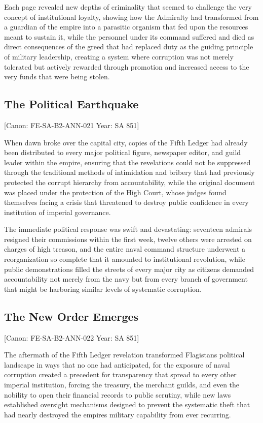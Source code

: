 Each page revealed new depths of criminality that seemed to challenge
the very concept of institutional loyalty, showing how the Admiralty had
transformed from a guardian of the empire into a parasitic organism that
fed upon the resources meant to sustain it, while the personnel under
its command suffered and died as direct consequences of the greed that
had replaced duty as the guiding principle of military leadership,
creating a system where corruption was not merely tolerated but actively
rewarded through promotion and increased access to the very funds that
were being stolen.

\subsection{The Political Earthquake}\label{the-political-earthquake}

{[}Canon: FE-SA-B2-ANN-021 \textbar{} Year: SA 851{]}

When dawn broke over the capital city, copies of the Fifth Ledger had
already been distributed to every major political figure, newspaper
editor, and guild leader within the empire, ensuring that the
revelations could not be suppressed through the traditional methods of
intimidation and bribery that had previously protected the corrupt
hierarchy from accountability, while the original document was placed
under the protection of the High Court, whose judges found themselves
facing a crisis that threatened to destroy public confidence in every
institution of imperial governance.

The immediate political response was swift and devastating: seventeen
admirals resigned their commissions within the first week, twelve others
were arrested on charges of high treason, and the entire naval command
structure underwent a reorganization so complete that it amounted to
institutional revolution, while public demonstrations filled the streets
of every major city as citizens demanded accountability not merely from
the navy but from every branch of government that might be harboring
similar levels of systematic corruption.

\subsection{The New Order Emerges}\label{the-new-order-emerges}

{[}Canon: FE-SA-B2-ANN-022 \textbar{} Year: SA 851{]}

The aftermath of the Fifth Ledger revelation transformed
Flagistan\textquotesingle s political landscape in ways that no one had
anticipated, for the exposure of naval corruption created a precedent
for transparency that spread to every other imperial institution,
forcing the treasury, the merchant guilds, and even the nobility to open
their financial records to public scrutiny, while new laws established
oversight mechanisms designed to prevent the systematic theft that had
nearly destroyed the empire\textquotesingle s military capability from
ever recurring.

